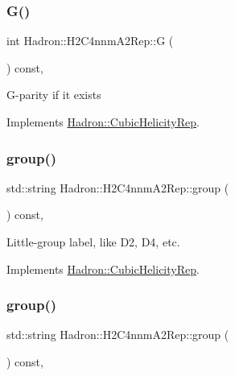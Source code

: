 \subsubsection{\texorpdfstring{G()}{G()}\hspace{0.1cm}{\footnotesize\ttfamily [3/3]}}
{\footnotesize\ttfamily int Hadron\+::\+H2\+C4nnm\+A2\+Rep\+::G (\begin{DoxyParamCaption}{ }\end{DoxyParamCaption}) const\hspace{0.3cm}{\ttfamily [inline]}, {\ttfamily [virtual]}}

G-\/parity if it exists 

Implements \mbox{\hyperlink{structHadron_1_1CubicHelicityRep_a50689f42be1e6170aa8cf6ad0597018b}{Hadron\+::\+Cubic\+Helicity\+Rep}}.

\mbox{\label{structHadron_1_1H2C4nnmA2Rep_a5a67d986be4ac8ac591051bea3159855}} 
\subsubsection{\texorpdfstring{group()}{group()}\hspace{0.1cm}{\footnotesize\ttfamily [1/5]}}
{\footnotesize\ttfamily std\+::string Hadron\+::\+H2\+C4nnm\+A2\+Rep\+::group (\begin{DoxyParamCaption}{ }\end{DoxyParamCaption}) const\hspace{0.3cm}{\ttfamily [inline]}, {\ttfamily [virtual]}}

Little-\/group label, like D2, D4, etc. 

Implements \mbox{\hyperlink{structHadron_1_1CubicHelicityRep_a101a7d76cd8ccdad0f272db44b766113}{Hadron\+::\+Cubic\+Helicity\+Rep}}.

\mbox{\label{structHadron_1_1H2C4nnmA2Rep_a5a67d986be4ac8ac591051bea3159855}} 
\subsubsection{\texorpdfstring{group()}{group()}\hspace{0.1cm}{\footnotesize\ttfamily [2/5]}}
{\footnotesize\ttfamily std\+::string Hadron\+::\+H2\+C4nnm\+A2\+Rep\+::group (\begin{DoxyParamCaption}{ }\end{DoxyParamCaption}) const\hspace{0.3cm}{\ttfamily [inline]}, {\ttfamily [virtual]}}

